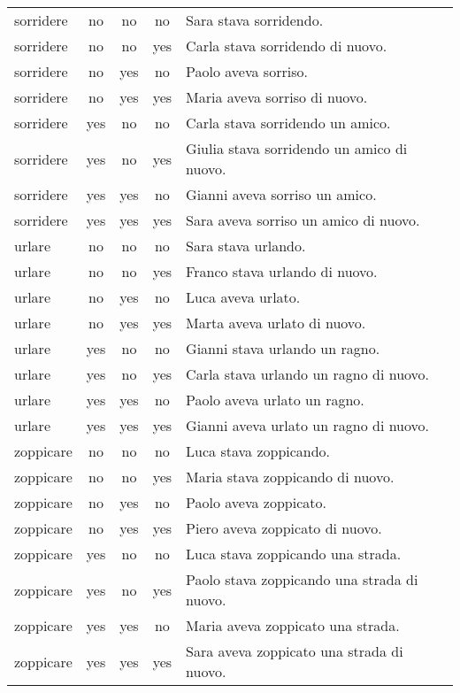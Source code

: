 \begin{longtable}{l|ccc|p{5cm}}
sorridere  & no   & no         & no        & Sara stava sorridendo.                           \\
sorridere  & no   & no         & yes       & Carla stava sorridendo di nuovo.                 \\
sorridere  & no   & yes        & no        & Paolo aveva sorriso.                             \\
sorridere  & no   & yes        & yes       & Maria aveva sorriso di nuovo.                    \\
sorridere  & yes  & no         & no        & Carla stava sorridendo un amico.                 \\
sorridere  & yes  & no         & yes       & Giulia stava sorridendo un amico di nuovo.       \\
sorridere  & yes  & yes        & no        & Gianni aveva sorriso un amico.                   \\
sorridere  & yes  & yes        & yes       & Sara aveva sorriso un amico di nuovo.            \\
urlare     & no   & no         & no        & Sara stava urlando.                              \\
urlare     & no   & no         & yes       & Franco stava urlando di nuovo.                   \\
urlare     & no   & yes        & no        & Luca aveva urlato.                               \\
urlare     & no   & yes        & yes       & Marta aveva urlato di nuovo.                     \\
urlare     & yes  & no         & no        & Gianni stava urlando un ragno.                   \\
urlare     & yes  & no         & yes       & Carla stava urlando un ragno di nuovo.           \\
urlare     & yes  & yes        & no        & Paolo aveva urlato un ragno.                     \\
urlare     & yes  & yes        & yes       & Gianni aveva urlato un ragno di nuovo.           \\
zoppicare  & no   & no         & no        & Luca stava zoppicando.                           \\
zoppicare  & no   & no         & yes       & Maria stava zoppicando di nuovo.                 \\
zoppicare  & no   & yes        & no        & Paolo aveva zoppicato.                           \\
zoppicare  & no   & yes        & yes       & Piero aveva zoppicato di nuovo.                  \\
zoppicare  & yes  & no         & no        & Luca stava zoppicando una strada.                \\
zoppicare  & yes  & no         & yes       & Paolo stava zoppicando una strada di nuovo.      \\
zoppicare  & yes  & yes        & no        & Maria aveva zoppicato una strada.                \\
zoppicare  & yes  & yes        & yes       & Sara aveva zoppicato una strada di nuovo.     
\end{longtable}
